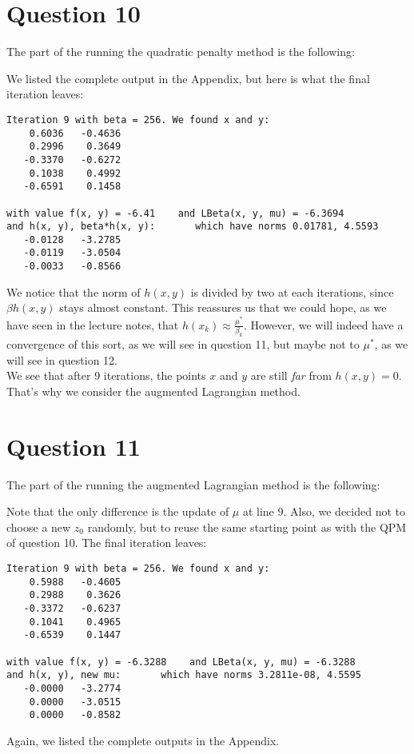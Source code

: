\documentclass{article}
\begin{document}
\section*{Question 10}
The part of the  running the quadratic penalty method is the following:


We listed the complete output in the Appendix, but here is what the final iteration leaves:
\begin{lstlisting}
Iteration 9 with beta = 256. We found x and y:
    0.6036   -0.4636
    0.2996    0.3649
   -0.3370   -0.6272
    0.1038    0.4992
   -0.6591    0.1458

with value f(x, y) = -6.41    and LBeta(x, y, mu) = -6.3694
and h(x, y), beta*h(x, y):       which have norms 0.01781, 4.5593
   -0.0128   -3.2785
   -0.0119   -3.0504
   -0.0033   -0.8566
\end{lstlisting}

We notice that the norm of $h(x, y)$ is divided by two at each iterations, since $\beta h(x, y)$ stays almost constant.
This reassures us that we could hope, as we have seen in the lecture notes, that $h(x_k) \approx \frac{\mu^*}{\beta_k}$. However, we will indeed have a convergence of this sort, as we will see in question 11, but maybe not to $\mu^*$, as we will see in question 12.\\
We see that after 9 iterations, the points $x$ and $y$ are still \textit{far} from $h(x, y) = 0$. That's why we consider the augmented Lagrangian method.


\section*{Question 11}
The part of the  running the augmented Lagrangian method is the following:


Note that the only difference is the update of $\mu$ at line 9. Also, we decided not to choose a new $z_0$ randomly, but to reuse the same starting point as with the QPM of question 10.
The final iteration leaves:
\begin{lstlisting}
Iteration 9 with beta = 256. We found x and y:
    0.5988   -0.4605
    0.2988    0.3626
   -0.3372   -0.6237
    0.1041    0.4965
   -0.6539    0.1447

with value f(x, y) = -6.3288    and LBeta(x, y, mu) = -6.3288
and h(x, y), new mu:       which have norms 3.2811e-08, 4.5595
   -0.0000   -3.2774
    0.0000   -3.0515
    0.0000   -0.8582
\end{lstlisting}
Again, we listed the complete outputs in the Appendix.
\end{document}
